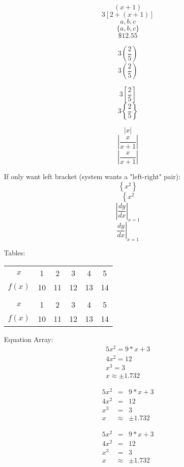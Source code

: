 \documentclass[11pt]{article}
\begin{document}
$$(x+1)$$
$$3[2+(x+1)]$$
$${a,b,c}$$
$$\{a,b,c\}$$
$$\$12.55$$

$$3(\frac{2}{5})$$	%
$$3\left(\frac{2}{5}\right)$$

$$3\left[\frac{2}{5}\right]$$
$$3\left\{\frac{2}{5}\right\}$$

$$|x|$$
$$|\frac{x}{x+1}|$$	%
$$\left|\frac{x}{x+1}\right|$$

If only want left bracket (system wants a "left-right" pair):
$$\left\{x^2\right\}$$
$$\left\{x^2\right.$$
$$\left|\frac{dy}{dx} \right|_{x=1}$$	%
$$\left.\frac{dy}{dx} \right|_{x=1}$$

Tables:

\begin{tabular}{|c|c|cccc|}	%

\hline
$x$ & 1 & 2 & 3 & 4 & 5 \\
$f(x)$ & 10 & 11 & 12 & 13 & 14 \\
\\
$x$ & 1 & 2 & 3 & 4 & 5 \\ \hline
$f(x)$ & 10 & 11 & 12 & 13 & 14\\	\hline
\end{tabular}

Equation Array:
\begin{eqnarray}
5x^2=9*x+3 \\
4x^2 = 12 \\
x^3 = 3 \\
x\approx\pm 1.732
\end{eqnarray}

\begin{eqnarray}
5x^2&=&9*x+3 \\
4x^2 &=& 12 \\
x^3 &=& 3 \\
x&\approx&\pm 1.732
\end{eqnarray}

\begin{eqnarray*}
5x^2&=&9*x+3 \\
4x^2 &=& 12 \\
x^3 &=& 3 \\
x&\approx&\pm 1.732
\end{eqnarray*}
\end{document}

